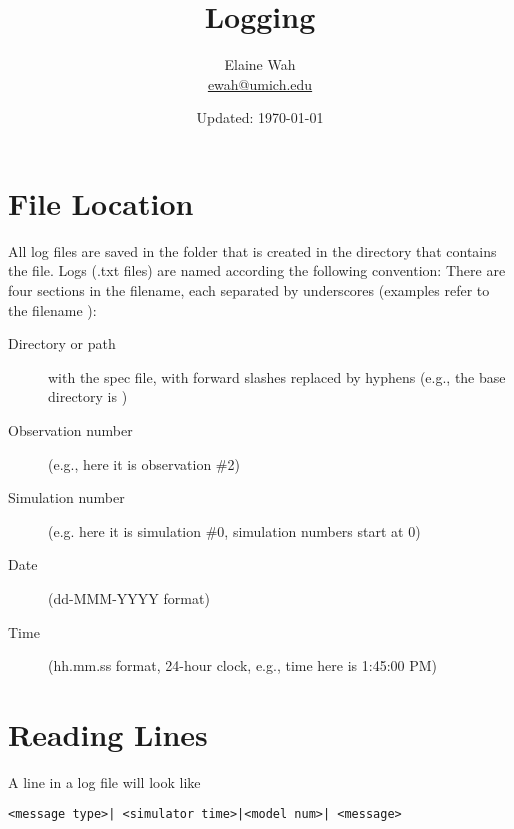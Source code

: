 \documentclass[11pt]{article}
\begin{document}
	
\title{Logging}
\author{
  Elaine Wah \\
  \href{mailto:ewah@umich.edu}{ewah@umich.edu}
}
\date{Updated: \today}
\maketitle

\section{File Location}

All log files are saved in the folder  that is created in the
directory that contains the  file.  Logs (.txt
files) are named according the following convention: There are four sections in
the filename, each separated by underscores (examples refer to the filename
):

\begin{description}
\item[Directory or path] with the spec file, with forward slashes replaced by
  hyphens (e.g., the base directory is )
\item[Observation number] (e.g., here it is observation \#2)
\item[Simulation number] (e.g. here it is simulation \#0, simulation numbers
  start at 0)
\item[Date] (dd-MMM-YYYY format)
\item[Time] (hh.mm.ss format, 24-hour clock, e.g., time here is 1:45:00 PM)
\end{description}

\section{Reading Lines}

A line in a log file will look like

\begin{verbatim}
<message type>| <simulator time>|<model num>| <message>
\end{verbatim}
\end{document}
